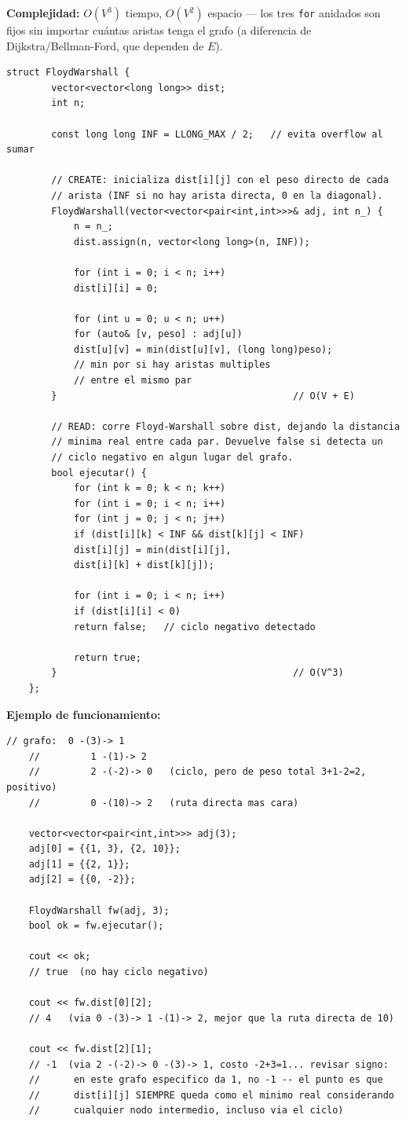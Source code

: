 \documentclass[10pt,a4paper,twocolumn]{article}
\begin{document}
\textbf{Complejidad:} $O(V^3)$ tiempo, $O(V^2)$ espacio — los tres
\texttt{for} anidados son fijos sin importar cuántas aristas tenga el
grafo (a diferencia de Dijkstra/Bellman-Ford, que dependen de $E$).

\begin{lstlisting}[style=cpp]
	struct FloydWarshall {
		vector<vector<long long>> dist;
		int n;
		
		const long long INF = LLONG_MAX / 2;   // evita overflow al sumar
		
		// CREATE: inicializa dist[i][j] con el peso directo de cada
		// arista (INF si no hay arista directa, 0 en la diagonal).
		FloydWarshall(vector<vector<pair<int,int>>>& adj, int n_) {
			n = n_;
			dist.assign(n, vector<long long>(n, INF));
			
			for (int i = 0; i < n; i++)
			dist[i][i] = 0;
			
			for (int u = 0; u < n; u++)
			for (auto& [v, peso] : adj[u])
			dist[u][v] = min(dist[u][v], (long long)peso);
			// min por si hay aristas multiples
			// entre el mismo par
		}                                          // O(V + E)
		
		// READ: corre Floyd-Warshall sobre dist, dejando la distancia
		// minima real entre cada par. Devuelve false si detecta un
		// ciclo negativo en algun lugar del grafo.
		bool ejecutar() {
			for (int k = 0; k < n; k++)
			for (int i = 0; i < n; i++)
			for (int j = 0; j < n; j++)
			if (dist[i][k] < INF && dist[k][j] < INF)
			dist[i][j] = min(dist[i][j],
			dist[i][k] + dist[k][j]);
			
			for (int i = 0; i < n; i++)
			if (dist[i][i] < 0)
			return false;   // ciclo negativo detectado
			
			return true;
		}                                          // O(V^3)
	};
\end{lstlisting}

\textbf{Ejemplo de funcionamiento:}

\begin{lstlisting}[style=cpp]
	// grafo:  0 -(3)-> 1
	//         1 -(1)-> 2
	//         2 -(-2)-> 0   (ciclo, pero de peso total 3+1-2=2, positivo)
	//         0 -(10)-> 2   (ruta directa mas cara)
	
	vector<vector<pair<int,int>>> adj(3);
	adj[0] = {{1, 3}, {2, 10}};
	adj[1] = {{2, 1}};
	adj[2] = {{0, -2}};
	
	FloydWarshall fw(adj, 3);
	bool ok = fw.ejecutar();
	
	cout << ok;
	// true  (no hay ciclo negativo)
	
	cout << fw.dist[0][2];
	// 4   (via 0 -(3)-> 1 -(1)-> 2, mejor que la ruta directa de 10)
	
	cout << fw.dist[2][1];
	// -1  (via 2 -(-2)-> 0 -(3)-> 1, costo -2+3=1... revisar signo:
	//      en este grafo especifico da 1, no -1 -- el punto es que
	//      dist[i][j] SIEMPRE queda como el minimo real considerando
	//      cualquier nodo intermedio, incluso via el ciclo)
\end{lstlisting}
\end{document}
